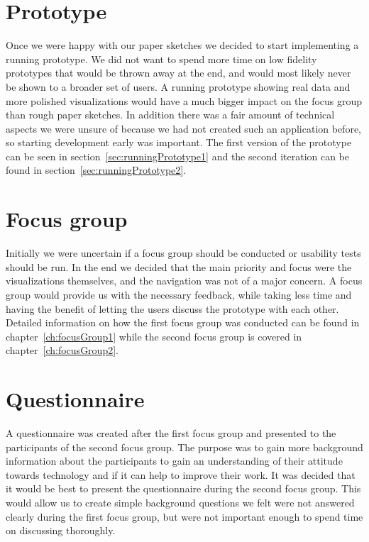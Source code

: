\section{Prototype}
Once we were happy with our paper sketches we decided to start implementing a running prototype. We did not want to spend more time on low fidelity prototypes that would be thrown away at the end, and would most likely never be shown to a broader set of users. A running prototype showing real data and more polished visualizations would have a much bigger impact on the focus group than rough paper sketches. In addition there was a fair amount of technical aspects we were unsure of because we had not created such an application before, so starting development early was important. The first version of the prototype can be seen in section~\ref{sec:runningPrototype1} and the second iteration can be found in section~\ref{sec:runningPrototype2}.

\section{Focus group}
Initially we were uncertain if a focus group should be conducted or usability tests should be run. In the end we decided that the main priority and focus were the visualizations themselves, and the navigation was not of a major concern. A focus group would provide us with the necessary feedback, while taking less time and having the benefit of letting the users discuss the prototype with each other. Detailed information on how the first focus group was conducted can be found in chapter~\ref{ch:focusGroup1} while the second focus group is covered in chapter~\ref{ch:focusGroup2}.

\section{Questionnaire}
A questionnaire was created after the first focus group and presented to the participants of the second focus group. The purpose was to gain more background information about the participants to gain an understanding of their attitude towards technology and if it can help to improve their work. It was decided that it would be best to present the questionnaire during the second focus group. This would allow us to create simple background questions we felt were not answered clearly during the first focus group, but were not important enough to spend time on discussing thoroughly.

